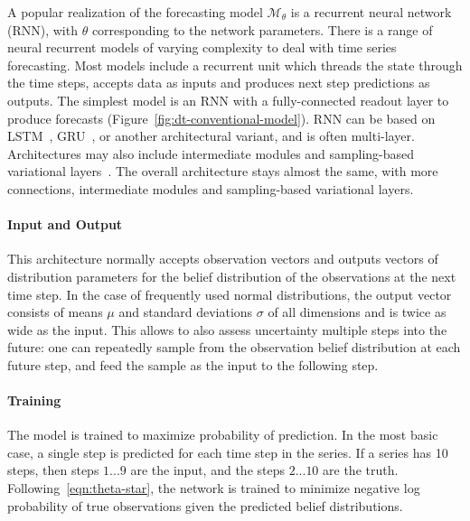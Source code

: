 \documentclass[runningheads]{llncs}
\begin{document}
A popular realization of the forecasting model
$\mathcal{M}_\theta$ is a recurrent neural network (RNN), with
$\theta$ corresponding to the network parameters.  There is a
range of neural recurrent models of varying complexity to deal
with time series forecasting. Most models include a recurrent
unit which threads the state through the time steps, accepts
data as inputs and produces next step predictions as outputs.
The simplest model is an RNN with a fully-connected readout
layer to produce forecasts
(Figure~\ref{fig:dt-conventional-model}).  RNN can be based on
LSTM~\cite{}, GRU~\cite{}, or another architectural variant, and
is often multi-layer.  Architectures  may also include
intermediate modules and sampling-based variational
layers~\cite{}. The overall architecture stays almost the same,
with more connections, intermediate modules and sampling-based
variational layers.

\paragraph{Input and Output} This architecture normally accepts
observation vectors and outputs vectors of distribution
parameters for the belief distribution of the observations at
the next time step. In the case of frequently used normal
distributions, the output vector consists of means $\mu$ and
standard deviations $\sigma$ of all dimensions and is twice as
wide as the input.  This allows to also assess uncertainty
multiple steps into the future: one can repeatedly sample from
the observation belief distribution at each future step, and
feed the sample as the input to the following step.

\paragraph{Training} The model is trained to maximize
probability of prediction. In the most basic case, a single step
is predicted for each time step in the series. If a series has
10 steps, then steps $1 ... 9$ are the input, and the steps $2
... 10$ are the truth. Following~\eqref{eqn:theta-star}, the
network is trained to minimize negative log probability of true
observations given the predicted belief distributions.
\end{document}
